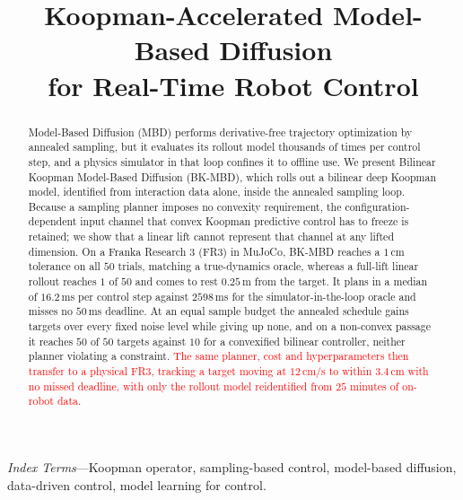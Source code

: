 \documentclass[letterpaper,10pt,conference]{ieeeconf}
\newcommand{\nd}[1]{\textcolor{red}{#1}}
\newcommand{\bkmbd}{\textsc{BK-MBD}}
\begin{document}

\title{Koopman-Accelerated Model-Based Diffusion\\for Real-Time Robot Control}


\maketitle

\begin{abstract}
Model-Based Diffusion (MBD) performs derivative-free trajectory optimization by annealed sampling, but it evaluates its rollout model thousands of times per control step, and a physics simulator in that loop confines it to offline use.
We present Bilinear Koopman Model-Based Diffusion (\bkmbd{}), which rolls out a bilinear deep Koopman model, identified from interaction data alone, inside the annealed sampling loop.
Because a sampling planner imposes no convexity requirement, the configuration-dependent input channel that convex Koopman predictive control has to freeze is retained; we show that a linear lift cannot represent that channel at any lifted dimension.
On a Franka Research 3 (FR3) in MuJoCo, \bkmbd{} reaches a $1$\,cm tolerance on all $50$ trials, matching a true-dynamics oracle, whereas a full-lift linear rollout reaches $1$ of $50$ and comes to rest $0.25$\,m from the target.
It plans in a median of $16.2$\,ms per control step against $2598$\,ms for the simulator-in-the-loop oracle and misses no $50$\,ms deadline.
At an equal sample budget the annealed schedule gains targets over every fixed noise level while giving up none, and on a non-convex passage it reaches $50$ of $50$ targets against $10$ for a convexified bilinear controller, neither planner violating a constraint.
\nd{The same planner, cost and hyperparameters then transfer to a physical FR3, tracking a target moving at $12$\,cm/s to within $3.4$\,cm with no missed deadline, with only the rollout model reidentified from $25$ minutes of on-robot data.}
\end{abstract}

\noindent\textit{Index Terms}---Koopman operator, sampling-based control,
model-based diffusion, data-driven control, model learning for control.

\end{document}
